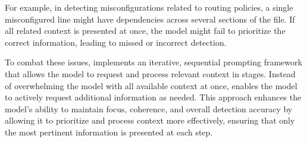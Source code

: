 For example, in detecting misconfigurations related to routing policies, a single misconfigured line might have dependencies across several sections of the file. If all related context is presented at once, the model might fail to prioritize the correct information, leading to missed or incorrect detection.


To combat these issues, \sysname{} implements an iterative, sequential prompting framework that allows the model to request and process relevant context in stages. Instead of overwhelming the model with all available context at once, \sysname{} enables the model to actively request additional information as needed. This approach enhances the model’s ability to maintain focus, coherence, and overall detection accuracy by allowing it to prioritize and process context more effectively, ensuring that only the most pertinent information is presented at each step.

